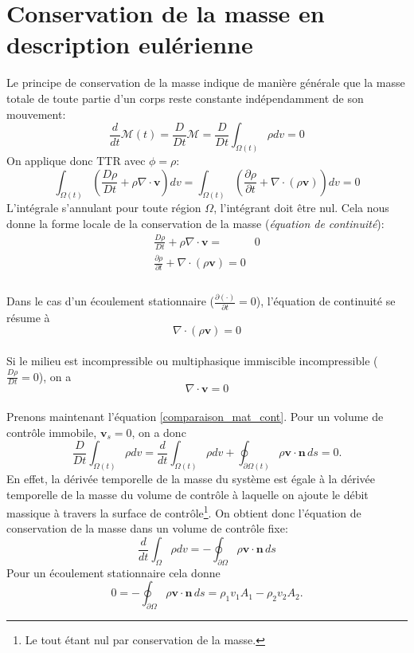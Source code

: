 \section{Conservation de la masse en description eulérienne}
Le principe de conservation de la masse indique de manière générale que la masse totale de toute partie d'un corps reste constante indépendamment de son mouvement: $$\frac{d}{dt}\mathcal{M}(t)=\frac{D}{Dt}\mathcal{M}=\frac{D}{Dt}\int_{\Omega (t)}\rho dv=0$$
On applique donc TTR avec $\phi=\rho$:
$$\int_{\Omega (t)}\left(\frac{D\rho}{Dt}+\rho\nabla\cdot\textbf{v}\right)dv=\int_{\Omega (t)}\left(\frac{\partial \rho}{\partial t}+\nabla\cdot(\rho\textbf{v})\right)dv=0$$
L'intégrale s'annulant pour toute région $\Omega$, l'intégrant doit être nul. Cela nous donne la forme locale de la conservation de la masse (\emph{équation de continuité}):
$$\boxed{
\begin{aligned}
\frac{D\rho}{Dt}+\rho\nabla\cdot\textbf{v}=&0 \\
\frac{\partial \rho}{\partial t}+\nabla\cdot(\rho\textbf{v})=0\\
\end{aligned}
}$$
\paragraph{}
Dans le cas d'un écoulement stationnaire ($\frac{\partial(\cdot)}{\partial t}=0$), l'équation de continuité se résume à $$\nabla\cdot(\rho\textbf{v})=0$$
\paragraph{}
Si le milieu est incompressible ou multiphasique immiscible incompressible ($\frac{D\rho}{Dt}=0$), on a $$\nabla\cdot\textbf{v}=0$$
\paragraph{}
Prenons maintenant l'équation \ref{comparaison_mat_cont}. Pour un volume de contrôle immobile, $\textbf{v}_s=0$, on a donc $$\frac{D}{Dt}\int_{\Omega (t)}\rho dv=\frac{d}{dt}\int_{\Omega (t)}\rho dv+\oint_{\partial\Omega (t)}\rho\textbf{v}\cdot\textbf{\^n}\,ds=0.$$ En effet, la dérivée temporelle de la masse du système est égale à la dérivée temporelle de la masse du volume de contrôle à laquelle on ajoute le débit massique à travers la  surface de contrôle\footnote{Le tout étant nul par conservation de la masse.}. On obtient donc l'équation de conservation de la masse dans un volume de contrôle fixe:
$$\frac{d}{dt}\int_{\Omega }\rho dv=-\oint_{\partial\Omega }\rho\textbf{v}\cdot\textbf{\^n}\,ds$$
Pour un écoulement stationnaire cela donne 
$$0=-\oint_{\partial\Omega }\rho\textbf{v}\cdot\textbf{\^n}\,ds=\rho_1v_1A_1-\rho_2v_2A_2.$$
